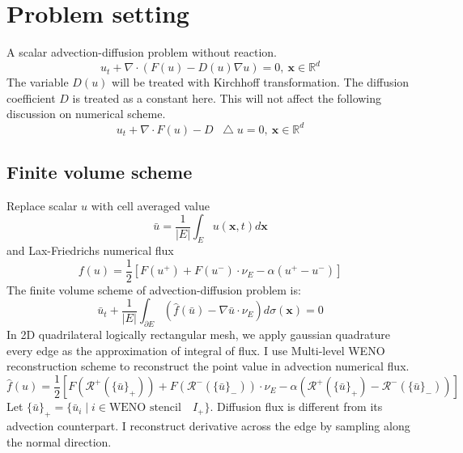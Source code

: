 \documentclass[smallextended]{svjour3}       %
\renewcommand{\div}{\nabla\cdot}
\renewcommand{\Re}{{\mathbb R}}
\newcommand{\bfx}{{\mathbf x}}
\newcommand*\Laplace{\mathop{}\!\mathbin\bigtriangleup}
\begin{document}
\section{Problem setting}
A scalar advection-diffusion problem without reaction.
\begin{equation} \label{eq:ad}
		  u_t + \div (F(u) - D(u) \nabla u) = 0, \ \bfx\in\Re^d
\end{equation}
The variable $D(u)$ will be treated with  Kirchhoff transformation.
The diffusion coefficient $D$ is treated as a constant here.
This will not affect the following discussion on numerical scheme.
\begin{equation} \label{eq:sad}
		  u_t + \div F(u) - D\Laplace u = 0, \ \bfx\in\Re^d
\end{equation}
\subsection{Finite volume scheme}
Replace scalar $u$ with cell averaged value 
\begin{equation}\label{eq:cellaveu}
		  \bar u = \frac{1}{|E|} \int_E u(\bfx, t) d\bfx
\end{equation}
and Lax-Friedrichs numerical flux
\begin{equation}\label{eq:lax}
		  f(u) = \frac{1}{2} [F(u^+)  + F(u^-) \cdot \nu_E - \alpha (u^+ - u^-)]
\end{equation}
The finite volume scheme of advection-diffusion problem is:
\begin{equation}\label{eq:fv}
		  \bar u_t + \frac{1}{|E|} \int_{\partial E} (\hat f(\bar u) - \nabla \bar u \cdot \nu_E) d\sigma(\bfx) = 0
\end{equation}
In 2D quadrilateral logically rectangular mesh, 
we apply gaussian quadrature every edge as the approximation of integral of flux. 
I use Multi-level WENO reconstruction scheme to reconstruct the point value in 
advection numerical flux.
\begin{equation}\label{eq:LaxFriedrichs}
		  \hat f(u) = \frac{1}{2} [F(\mathscr{R}^+(\{\bar u\}_+)) + F(\mathscr{R}^-(\{\bar u\}_-))\cdot \nu_E - 
		  \alpha(\mathscr{R}^+(\{\bar u\}_+) - \mathscr{R}^-(\{\bar u\}_-))] 
\end{equation}
Let $\{\bar u\}_+ = \{\bar u_i \mid i \in \text{WENO stencil} \quad I_+ \}$. 
Diffusion flux is different from its advection counterpart.
I reconstruct derivative across the edge by sampling along the normal direction.
\end{document}

